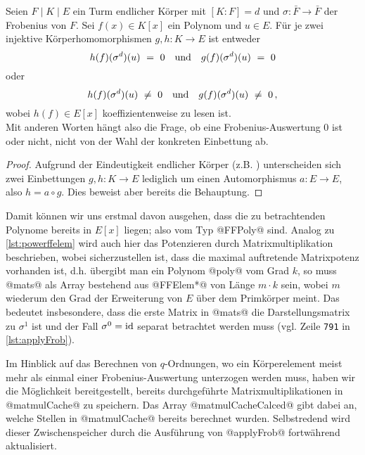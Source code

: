 \begin{lemma}
  \label{lemma:einbettung_egal}
  Seien $F \mid K\mid E$ ein Turm endlicher Körper mit $[K:F] = d$ und 
  $\sigma: \bar F\to \bar F$ der Frobenius von $F$. 
  Sei $f(x) \in K[x]$ ein Polynom und $u\in E$. Für je zwei
  injektive Körperhomomorphismen
  $g,h: K\to E$ ist entweder
  \[ h(f)(\sigma^d)(u) \ =\  0 \quad\text{und}\quad 
    g(f)(\sigma^d)(u) \ =\  0\]
  oder 
  \[ h(f)(\sigma^d)(u) \ \neq\  0 \quad\text{und}\quad 
    g(f)(\sigma^d)(u) \ \neq\  0\,,\]
  wobei $h(f) \in E[x]$ koeffizientenweise zu lesen ist.\\
  Mit anderen Worten hängt also die Frage, ob eine Frobenius-Auswertung $0$ 
  ist oder nicht, nicht von der Wahl der konkreten Einbettung ab.
\end{lemma}
\begin{proof}
  Aufgrund der Eindeutigkeit endlicher Körper (z.B.
  ) unterscheiden sich zwei
  Einbettungen $g,h: K\to E$ lediglich um einen Automorphismus $a: E\to E$,
  also $h = a \circ g$. Dies beweist aber bereits die Behauptung.
\end{proof}


Damit können wir uns erstmal davon ausgehen, dass die zu betrachtenden Polynome
bereits in $E[x]$ liegen; also vom Typ @FFPoly@ sind. Analog zu 
\autoref{lst:powerffelem} wird auch hier das Potenzieren durch
Matrixmultiplikation beschrieben, wobei sicherzustellen ist, dass die maximal
auftretende Matrixpotenz vorhanden ist, d.h. übergibt man ein Polynom @poly@
vom Grad $k$, so muss @mats@ als Array bestehend aus @FFElem*@ von Länge
$m\cdot k$ sein, wobei $m$ wiederum den Grad der Erweiterung von $E$ über dem
Primkörper meint. Das bedeutet insbesondere, dass die erste Matrix in @mats@
die Darstellungsmatrix zu $\sigma^1$ ist und der Fall $\sigma^0 = \operatorname{id}$ separat
betrachtet werden muss (vgl. Zeile \texttt{791} in \autoref{lst:applyFrob}).

Im Hinblick auf das Berechnen von $q$-Ordnungen, wo ein Körperelement meist
mehr als einmal einer Frobenius-Auswertung unterzogen werden muss, haben wir
die Möglichkeit bereitgestellt, bereits durchgeführte Matrixmultiplikationen in
@matmulCache@ zu speichern. Das Array @matmulCacheCalced@ gibt dabei an, welche
Stellen in @matmulCache@ bereits berechnet wurden. Selbstredend wird dieser 
Zwischenspeicher durch die Ausführung von @applyFrob@ fortwährend aktualisiert.

